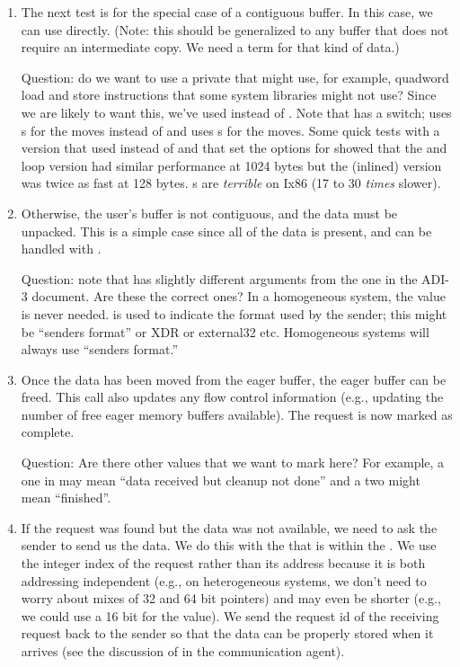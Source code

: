 \begin{enumerate}
\item The next test is for the special case of a contiguous buffer.  In this
  case, we can use  directly.  (Note: this should be
  generalized to any buffer that does not require an intermediate
  copy.  We need a term for that kind of data.)

  Question: do we want to use a private  that might use, for 
  example, quadword load and store instructions that some system libraries
  might not use?  Since we are likely to want this, we've used
   instead of .  Note that 
  has a  switch;  uses s for the
  moves instead of  and  uses
  s for the moves.  Some quick tests with a version that used
   instead of  and that set the options
   for  showed that the
   and  loop version had similar performance at
  1024 bytes but the (inlined)  version was twice as fast at
  128 bytes.  s are \emph{terrible} on Ix86 (17 to 30
  \emph{times} slower).

\item Otherwise, the user's buffer is not contiguous, and the data must be
  unpacked.  This is a simple case since all of the data is present, and 
  can be handled with .

  Question: note that  has slightly different arguments
  from the one in the ADI-3 document.  Are these the correct ones?  In a
  homogeneous system, the  value is never needed.
   is used to indicate the format used by the sender; this
  might be ``senders format'' or XDR or external32 etc.  Homogeneous systems
  will always use ``senders format.''

\item Once the data has been moved from the eager buffer, the eager buffer 
 can be freed.  This call also updates any flow control information (e.g.,
 updating the number of free eager memory buffers available).  The request is
 now marked as complete.

  Question: Are there other values that we want to mark here?  For example, 
  a one in  may mean ``data received but cleanup not done'' and
  a two might mean ``finished''.

\item If the request was found but the data was not available, we need to ask
  the sender to send us the data.  We do this with the  that is
  within the .  We use the integer index of the
  request rather than its address because it is both addressing independent
  (e.g., on heterogeneous systems, we don't need to worry about mixes of 32
  and 64 bit pointers) and may even be shorter (e.g., we could use a 16 bit
   for the value).  We send the request id of the receiving
  request back to the sender so that the data can be properly stored when it
  arrives (see the discussion of  in the
  communication agent).


\end{enumerate}
